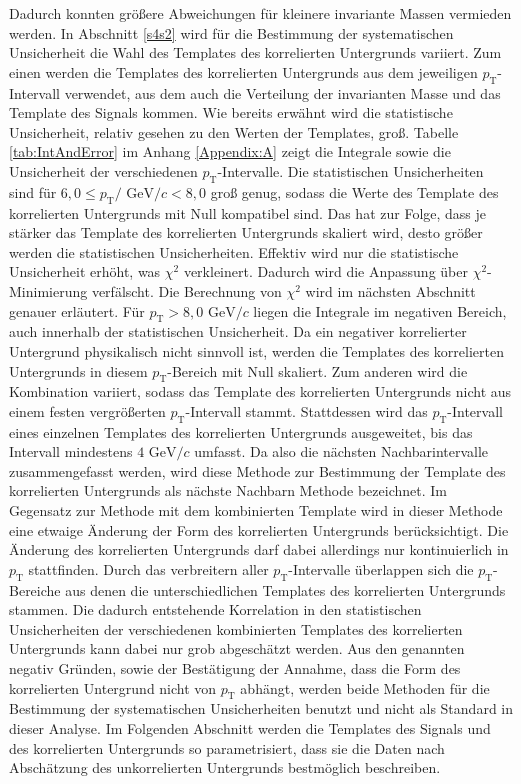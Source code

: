 Dadurch konnten größere Abweichungen für kleinere invariante Massen vermieden werden.
\newline
In Abschnitt \ref{s4s2} wird für die Bestimmung der systematischen Unsicherheit die Wahl des Templates des korrelierten Untergrunds variiert.
\newline
Zum einen werden die Templates des korrelierten Untergrunds aus dem jeweiligen $p_\text{T}$-Intervall verwendet, aus dem auch die Verteilung der invarianten Masse und das Template des Signals kommen.
Wie bereits erwähnt wird die statistische Unsicherheit, relativ gesehen zu den Werten der Templates, groß.
Tabelle \ref{tab:IntAndError} im Anhang \ref{Appendix:A} zeigt die Integrale sowie die Unsicherheit der verschiedenen $p_\text{T}$-Intervalle.
Die statistischen Unsicherheiten sind für $6,0 \leq p_\text{T}/\text{ GeV}/c < 8,0 $ groß genug, sodass die Werte des Template des korrelierten Untergrunds mit Null kompatibel sind.
Das hat zur Folge, dass je stärker das Template des korrelierten Untergrunds skaliert wird, desto größer werden die statistischen Unsicherheiten.
Effektiv wird nur die statistische Unsicherheit erhöht, was $\chi^{2}$ verkleinert.
Dadurch wird die Anpassung über $\chi^{2}$-Minimierung verfälscht.
Die Berechnung von $\chi^{2}$ wird im nächsten Abschnitt genauer erläutert.
\newline
Für $p_\text{T} > 8,0 \text{ GeV}/c$ liegen die Integrale im negativen Bereich, auch innerhalb der statistischen Unsicherheit.
Da ein negativer korrelierter Untergrund physikalisch nicht sinnvoll ist, werden die Templates des korrelierten Untergrunds in diesem $p_\text{T}$-Bereich mit Null skaliert.
\newline
Zum anderen wird die Kombination variiert, sodass das Template des korrelierten Untergrunds nicht aus einem festen vergrößerten $p_\text{T}$-Intervall stammt.
Stattdessen wird das $p_\text{T}$-Intervall eines einzelnen Templates des korrelierten Untergrunds ausgeweitet, bis das Intervall mindestens $4\text{ GeV}/c$ umfasst.
Da also die nächsten Nachbarintervalle zusammengefasst werden, wird diese Methode zur Bestimmung der Template des korrelierten Untergrunds als nächste Nachbarn Methode bezeichnet.
Im Gegensatz zur Methode mit dem kombinierten Template wird in dieser Methode eine etwaige Änderung der Form des korrelierten Untergrunds berücksichtigt.
Die Änderung des korrelierten Untergrunds darf dabei allerdings nur kontinuierlich in $p_\text{T}$ stattfinden.
Durch das verbreitern aller $p_\text{T}$-Intervalle überlappen sich die $p_\text{T}$-Bereiche aus denen die unterschiedlichen Templates des korrelierten Untergrunds stammen.
Die dadurch entstehende Korrelation in den statistischen Unsicherheiten der verschiedenen kombinierten Templates des korrelierten Untergrunds kann dabei nur grob abgeschätzt werden. 
\newpage
\noindent
Aus den genannten negativ Gründen, sowie der Bestätigung der Annahme, dass die Form des korrelierten Untergrund nicht von $p_\text{T}$ abhängt, werden beide Methoden für die Bestimmung der systematischen Unsicherheiten benutzt und nicht als Standard in dieser Analyse.
\newline
Im Folgenden Abschnitt werden die Templates des Signals und des korrelierten Untergrunds so parametrisiert, dass sie die Daten nach Abschätzung des unkorrelierten Untergrunds bestmöglich beschreiben.